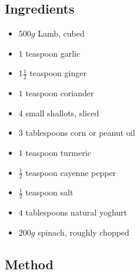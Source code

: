 \documentclass[11pt,a4paper]{article}
\begin{document}
\subsection*{Ingredients}

\begin{multicols}{2}

\begin{itemize}
  \item $ 500g $ Lamb, cubed
  \item $ 1 $ teaspoon garlic
  \item $ 1 \frac{1}{2} $ teaspoon ginger
  \item $ 1 $ teaspoon coriander
  \item $ 4 $ small shallots, sliced
  \item $ 3 $ tablespoons corn or peanut oil
\end{itemize}

\columnbreak

\begin{itemize}
  \item $ 1 $ teaspoon turmeric
  \item $ \frac{1}{2} $ teaspoon cayenne pepper
  \item $ \frac{1}{2} $ teaspoon salt
  \item $ 4 $ tablespoons natural yoghurt
  \item $ 200g $ spinach, roughly chopped
\end{itemize}

\end{multicols}

\medskip

\subsection*{Method}
\end{document}
